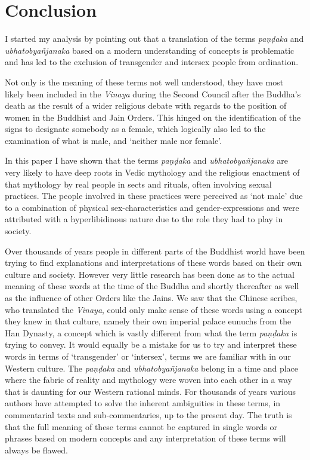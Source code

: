 \section{Conclusion}
I started my analysis by pointing out that a translation of the terms \textit{paṇḍaka} and \textit{ubhatob­yañ­janaka} based on a modern understanding of concepts is problematic and has led to the exclusion of transgender and intersex people from ordination.

Not only is the meaning of these terms not well understood, they have most likely been included in the \textit{Vinaya} during the Second Council after the Buddha's death as the result of a wider religious debate with regards to the position of women in the Buddhist and Jain Orders. This hinged on the identification of the signs to designate somebody as a female, which logically also led to the examination of what is male, and `neither male nor female'.

In this paper I have shown that the terms \textit{paṇḍaka} and \textit{ubhatob­yañ­janaka} are very likely to have deep roots in Vedic mythology and the religious enactment of that mythology by real people in sects and rituals, often involving sexual practices. The people involved in these practices were perceived as `not male' due to a combination of physical sex-characteristics and gender-expressions and were attributed with a hyperlibidinous nature due to the role they had to play in society.

Over thousands of years people in different parts of the Buddhist world have been trying to find explanations and interpretations of these words based on their own culture and society. However very little research has been done as to the actual meaning of these words at the time of the Buddha and shortly thereafter as well as the influence of other Orders like the Jains. We saw that the Chinese scribes, who translated the \textit{Vinaya}, could only make sense of these words using a concept they knew in that culture, namely their own imperial palace eunuchs from the Han Dynasty, a concept which is vastly different from what the term \textit{paṇḍaka} is trying to convey. It would equally be a mistake for us to try and interpret these words in terms of `transgender' or `intersex', terms we are familiar with in our Western culture. The \textit{paṇḍaka} and \textit{ubhatob­yañ­janaka} belong in a time and place where the fabric of reality and mythology were woven into each other in a way that is daunting for our Western rational minds. For thousands of years various authors have attempted to solve the inherent ambiguities in these terms, in commentarial texts and sub-commentaries, up to the present day. The truth is that the full meaning of these terms cannot be captured in single words or phrases based on modern concepts and any interpretation of these terms will always be flawed.

